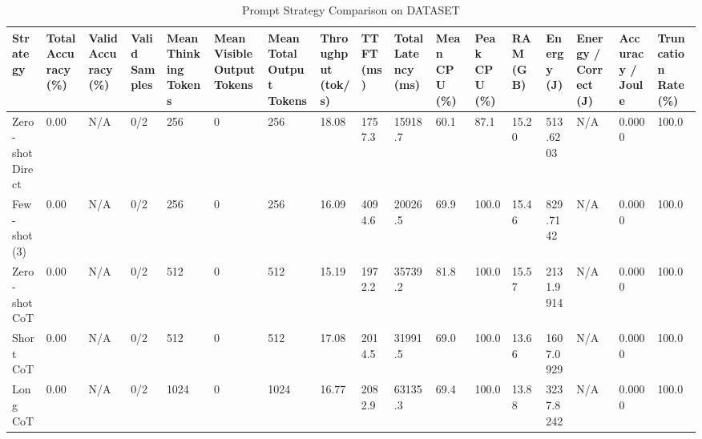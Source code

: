 \begin{table}
\caption{Prompt Strategy Comparison on DATASET}
\label{tab:strategy_comparison}
\begin{tabular}{lllllllllllllllll}
\toprule
Strategy & Total Accuracy (\%) & Valid Accuracy (\%) & Valid Samples & Mean Thinking Tokens & Mean Visible Output Tokens & Mean Total Output Tokens & Throughput (tok/s) & TTFT (ms) & Total Latency (ms) & Mean CPU (\%) & Peak CPU (\%) & RAM (GB) & Energy (J) & Energy / Correct (J) & Accuracy / Joule & Truncation Rate (\%) \\
\midrule
Zero-shot Direct & 0.00 & N/A & 0/2 & 256 & 0 & 256 & 18.08 & 1757.3 & 15918.7 & 60.1 & 87.1 & 15.20 & 513.6203 & N/A & 0.0000 & 100.0 \\
Few-shot (3) & 0.00 & N/A & 0/2 & 256 & 0 & 256 & 16.09 & 4094.6 & 20026.5 & 69.9 & 100.0 & 15.46 & 829.7142 & N/A & 0.0000 & 100.0 \\
Zero-shot CoT & 0.00 & N/A & 0/2 & 512 & 0 & 512 & 15.19 & 1972.2 & 35739.2 & 81.8 & 100.0 & 15.57 & 2131.9914 & N/A & 0.0000 & 100.0 \\
Short CoT & 0.00 & N/A & 0/2 & 512 & 0 & 512 & 17.08 & 2014.5 & 31991.5 & 69.0 & 100.0 & 13.66 & 1607.0929 & N/A & 0.0000 & 100.0 \\
Long CoT & 0.00 & N/A & 0/2 & 1024 & 0 & 1024 & 16.77 & 2082.9 & 63135.3 & 69.4 & 100.0 & 13.88 & 3237.8242 & N/A & 0.0000 & 100.0 \\
\bottomrule
\end{tabular}
\end{table}

